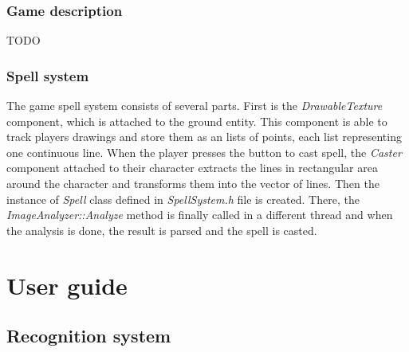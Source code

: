\subsection{Game description}
TODO

\subsection{Spell system}
The game spell system consists of several parts. First is the \emph{DrawableTexture} component, which is attached to the ground entity. This component is able to track players drawings and store them as an lists of points, each list representing one continuous line. When the player presses the button to cast spell, the \emph{Caster} component attached to their character extracts the lines in rectangular area around the character and transforms them into the vector of lines. Then the instance of \emph{Spell} class defined in \emph{SpellSystem.h} file is created. There, the \emph{ImageAnalyzer::Analyze} method is finally called in a different thread and when the analysis is done, the result is parsed and the spell is casted.

\chapter{User guide}
\section{Recognition system}
